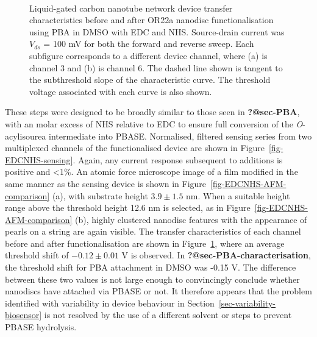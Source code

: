 \documentclass[
  a4paper,
]{scrbook}
\begin{document}
\begin{figure}
\begin{minipage}[t]{0.45\linewidth}
{}

\end{minipage}%
%
\begin{minipage}[t]{0.01\linewidth}

{\centering 

~

}

\end{minipage}%

\caption{\label{fig-EDCNHS-TX}Liquid-gated carbon nanotube network
device transfer characteristics before and after OR22a nanodisc
functionalisation using PBA in DMSO with EDC and NHS. Source-drain
current was \(V_{ds}\) = 100 mV for both the forward and reverse sweep.
Each subfigure corresponds to a different device channel, where (a) is
channel 3 and (b) is channel 6. The dashed line shown is tangent to the
subthreshold slope of the characteristic curve. The threshold voltage
associated with each curve is also shown.}

\end{figure}

These steps were designed to be broadly similar to those seen in
\textbf{?@sec-PBA}, with an molar excess of NHS relative to EDC to
ensure full conversion of the \emph{O}-acylisourea intermediate into
PBASE. Normalised, filtered sensing series from two multiplexed channels
of the functionalised device are shown in
Figure~\ref{fig-EDCNHS-sensing}. Again, any current response subsequent
to additions is positive and \textless1\%. An atomic force microscope
image of a film modified in the same manner as the sensing device is
shown in Figure~\ref{fig-EDCNHS-AFM-comparison} (a), with substrate
height \(3.9\pm1.5\) nm. When a suitable height range above the
threshold height 12.6 nm is selected, as in
Figure~\ref{fig-EDCNHS-AFM-comparison} (b), highly clustered nanodisc
features with the appearance of pearls on a string are again visible.
The transfer characteristics of each channel before and after
functionalisation are shown in Figure~\ref{fig-EDCNHS-TX}, where an
average threshold shift of \(-0.12\pm0.01\) V is observed. In
\textbf{?@sec-PBA-characterisation}, the threshold shift for PBA
attachment in DMSO was -0.15 V. The difference between these two values
is not large enough to convincingly conclude whether nanodiscs have
attached via PBASE or not. It therefore appears that the problem
identified with variability in device behaviour in
Section~\ref{sec-variability-biosensor} is not resolved by the use of a
different solvent or steps to prevent PBASE hydrolysis.
\end{document}
